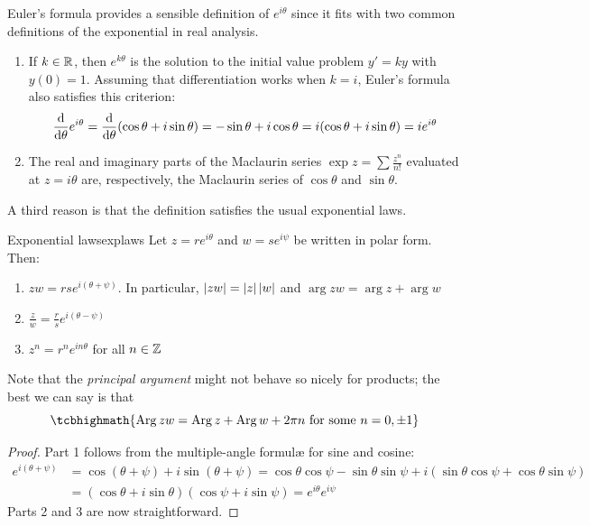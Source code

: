 Euler's formula provides a sensible definition of $e^{i\theta}$ since it fits with two common definitions of the exponential in real analysis.
\begin{enumerate}
  \item If $k\in\mathbb{R}$, then $e^{k\theta}$ is the solution to the initial value problem $y'=ky$ with $y(0)=1$. Assuming that differentiation works when $k=i$, Euler's formula also satisfies this criterion:
  \[
  	\frac{\mathrm{d} }{\mathrm{d} \theta} e^{i\theta} = \frac{\mathrm{d} }{\mathrm{d} \theta}(\cos\theta+i\sin\theta) = -\sin\theta+i\cos\theta=i(\cos\theta+i\sin\theta) = ie^{i\theta} 
  \]
	\item The real and imaginary parts of the Maclaurin series $\exp z=\sum\frac{z^n}{n!}$ evaluated at $z=i\theta$ are, respectively, the Maclaurin series of $\cos\theta$ and $\sin\theta$.
\end{enumerate}

A third reason is that the definition satisfies the usual exponential laws.

\begin{lemm}{Exponential laws}{explaws}
	Let $z=re^{i\theta}$ and $w=se^{i\psi}$ be written in polar form. Then:
	\begin{enumerate}
	  \item $zw=rse^{i(\theta+\psi)}$. In particular, $\left| zw\right|=\left| z\right|\left| w\right|$ and $\arg zw=\arg z+\arg w$
	  \item $\frac zw=\frac rse^{i(\theta-\psi)}$
	  \item $z^n=r^ne^{in\theta}$ for all $n\in\mathbb{Z}$
	\end{enumerate}
\end{lemm}

Note that the \emph{principal argument} might not behave so nicely for products; the best we can say is that
\[\tcbhighmath{\Arg zw=\Arg z+\Arg w+2\pi n\text{ for some }n=0,\pm 1}\]

\begin{proof}
Part 1 follows from the multiple-angle formulæ for sine and cosine:
\begin{align*}
e^{i(\theta+\psi)}&=\cos(\theta+\psi)+i\sin(\theta+\psi) =\cos\theta\cos\psi-\sin\theta\sin\psi+ i(\sin\theta\cos\psi+\cos\theta\sin\psi)\\
&=(\cos\theta+i\sin\theta)(\cos\psi+i\sin\psi) =e^{i\theta}e^{i\psi}
\end{align*}
Parts 2 and 3 are now straightforward.
\end{proof}

